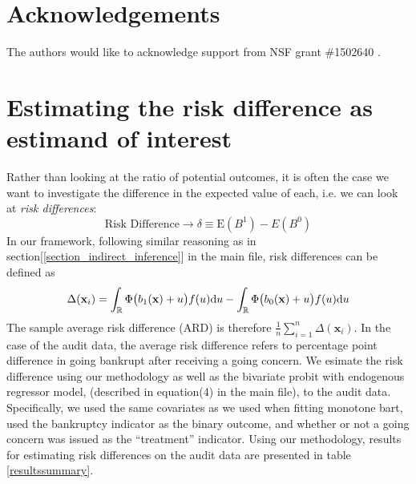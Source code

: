 \documentclass[aoas,preprint, 11pt, dvipsnames, table, x11name]{imsart}
\newcommand{\E}{\mbox{E}}
\theoremstyle{remark}
\begin{document}
	
	
	
	
	
	
	
	
	
	
	
	
	\section*{Acknowledgements}
	The authors would like to acknowledge support from NSF grant \#1502640 .
	
	\clearpage
	\appendix
	\section{Estimating the risk difference as estimand of interest}\label{4.4}
	Rather than looking at the ratio of potential outcomes, it is often the case we want to investigate the difference in the expected value of each, i.e. we can look at \emph{risk differences}:
	\[\text{Risk Difference}\rightarrow \delta \equiv \E(B^1)-E(B^0)\]
	In our framework, following similar reasoning as in section[\ref{section_indirect_inference}] in the main file,  risk differences can be defined as 
	\[\Delta(\mathbf{x}_i)=\int_{\mathbb{R}} \Phi\qty(b_1(\mathbf{x})+u)f(u)\dd u - \int_{\mathbb{R}} \Phi\qty(b_0(\mathbf{x})+u) f(u)\dd u\]
	The sample average risk difference (ARD) is therefore $\frac{1}{n}\sum_{i=1}^{n}\Delta(\mathbf{x}_i)$. In the case of the audit data, the average risk difference refers to percentage point difference in going bankrupt after receiving a going concern. We esimate the risk difference using our methodology as well as the bivariate probit with endogenous regressor model, (described in equation(4) in the main file), to the audit data.  Specifically, we used the same covariates as we used when fitting monotone bart, used the bankruptcy indicator as the binary outcome, and whether or not a going concern was issued as the ``treatment'' indicator.  Using our methodology, results for estimating risk differences on the audit data are presented in table \ref{resultssummary}.
	
\end{document}
